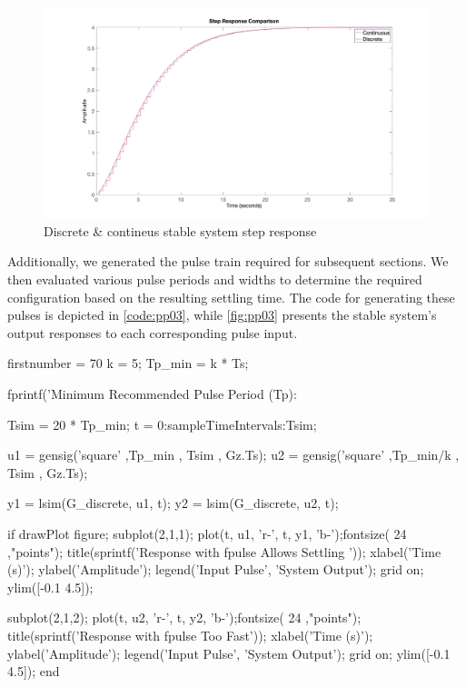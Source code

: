 \begin{figure}
	\centering
	\includegraphics[width=\textwidth]{images/pp02.png}
	\caption{Discrete \& contineus stable system step response}
	\label{fig:pp02}
\end{figure}

Additionally, we generated the pulse train required for subsequent sections. We then evaluated various pulse periods and widths to determine the required configuration based on the resulting settling time. The code for generating these pulses is depicted in \autoref{code:pp03}, while \autoref{fig:pp03} presents the stable system's output responses to each corresponding pulse input.

\begin{code}
	\begin{matlabcode}{firstnumber = 70}
k = 5; %
Tp_min = k * Ts; %

fprintf('Minimum Recommended Pulse Period (Tp): %

Tsim = 20 * Tp_min; 
t = 0:sampleTimeIntervals:Tsim;

u1 = gensig('square' ,Tp_min , Tsim , Gz.Ts); 
u2 = gensig('square' ,Tp_min/k , Tsim , Gz.Ts); 

y1 = lsim(G_discrete, u1, t);
y2 = lsim(G_discrete, u2, t);

if drawPlot
	figure;
	subplot(2,1,1);
	plot(t, u1, 'r-', t, y1, 'b-');fontsize( 24 ,"points");
	title(sprintf('Response with fpulse Allows Settling '));
	xlabel('Time (s)'); ylabel('Amplitude'); legend('Input Pulse', 'System Output'); grid on;
	ylim([-0.1 4.5]); 
	
	subplot(2,1,2);
	plot(t, u2, 'r-', t, y2, 'b-');fontsize( 24 ,"points");
	title(sprintf('Response with fpulse Too Fast'));
	xlabel('Time (s)'); ylabel('Amplitude'); legend('Input Pulse', 'System Output'); grid on;
	ylim([-0.1 4.5]);  
end
	\end{matlabcode}
	\label{code:pp03}
\end{code}

